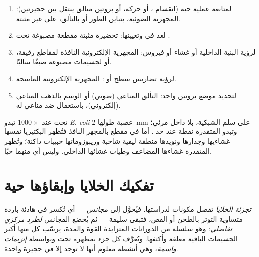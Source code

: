 \begin{method}\label{met:b1:cell-unit-of-life:choose}
\begin{enumerate}
  \item لمتابعة عملية حية (انقسام ، أو حركة، أو بروتين متألق
        ينتقل بين حجيرتين): المجهرية الضوئية، بتباين الطور أو
        بالتألق، على  غير مثبتة.
  \item لعد  في  وتعيينها: تحضيرة مثبتة مقطعة مصبوغة تحت
        .
  \item لرؤية البنية الداخلية  أو غشاء أو فيروس: المجهرية
        الإلكترونية النافذة لمقاطع رقيقة، أو لجسيمات مصبوغة صبغًا
        سالبًا.
  \item لرؤية تضاريس سطح  أو : المجهرية الإلكترونية الماسحة.
  \item لتحديد موضع بروتين واحد: التألق المناعي (ضوئي) أو الوسم
        بالذهب المناعي (إلكتروني)، باستعمال ضد مناعي له.
\end{enumerate}
\end{method}

\begin{example}\label{ex:b1:cell-unit-of-life:seeing}
تحت  عند $1000\times$ تبدو  \emph{E. coli} عصية
طولها \qty{2}{mm} على سلم الشبكية، بلا داخل مرئي؛ وتبدو المتقدرة
نقطة عند حد . أما في مقطع بالمجهر النافذ فتُظهر
البكتيريا نفسها غشاءيها وجدارها ونويدها منطقة ليفية شاحبة
وريبوزوماتها حبيبات داكنة؛ وتُظهر المتقدرة غشاءها المضاعف وطيات
غشائها الداخلي. وليس أي منهما حيًا.
\end{example}

\section{تفكيك الخلايا وإبقاؤها حية}

\begin{definition}\label{def:b1:cell-unit-of-life:fractionation}
\emph{تجزئة الخلايا} تفصل مكونات 
لدراستها. فيُحوَّل  إلى \emph{مجانس} --- أي تُكسر
 في هادئة باردة متساوية التوتر بالطحن أو القص، فتبقى 
سليمة --- ثم يُخضع المجانس \emph{لطرد مركزي تفاضلي}:
وهو سلسلة من الدورانات المتزايدة القوة والمدة، يرسّب كل منها أكبر
الجسيمات الباقية معلقة وأكثفها. ويُعرَّف كل جزء بمظهره تحت  وبواسطة \emph{إنزيمات واسمة}، وهي أنشطة
معلوم أنها لا توجد إلا في حجيرة واحدة.
\end{definition}

